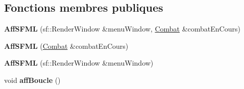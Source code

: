 \subsection*{Fonctions membres publiques}
\begin{DoxyCompactItemize}
\item 
\mbox{\label{class_aff_s_f_m_l_a4a0e2d499d276524b651d77678597a06}} 
{\bfseries Aff\+S\+F\+ML} (sf\+::\+Render\+Window \&menu\+Window, \hyperlink{class_combat}{Combat} \&combat\+En\+Cours)
\item 
\mbox{\label{class_aff_s_f_m_l_abe47621ba363abdaf4e68cbda27b9017}} 
{\bfseries Aff\+S\+F\+ML} (\hyperlink{class_combat}{Combat} \&combat\+En\+Cours)
\item 
\mbox{\label{class_aff_s_f_m_l_a641895d24739ca5f338ddc2fe3f912d7}} 
{\bfseries Aff\+S\+F\+ML} (sf\+::\+Render\+Window \&menu\+Window)
\item 
\mbox{\label{class_aff_s_f_m_l_add94bec75d1075827df1722e3e182518}} 
void {\bfseries aff\+Boucle} ()
\end{DoxyCompactItemize}
